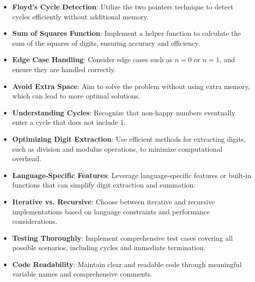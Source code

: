 \begin{itemize}
    \item \textbf{Floyd's Cycle Detection}: Utilize the two pointers technique to detect cycles efficiently without additional memory.
    
    \item \textbf{Sum of Squares Function}: Implement a helper function to calculate the sum of the squares of digits, ensuring accuracy and efficiency.
    
    \item \textbf{Edge Case Handling}: Consider edge cases such as \(n = 0\) or \(n = 1\), and ensure they are handled correctly.
    
    \item \textbf{Avoid Extra Space}: Aim to solve the problem without using extra memory, which can lead to more optimal solutions.
    
    \item \textbf{Understanding Cycles}: Recognize that non-happy numbers eventually enter a cycle that does not include 1.
    
    \item \textbf{Optimizing Digit Extraction}: Use efficient methods for extracting digits, such as division and modulus operations, to minimize computational overhead.
    
    \item \textbf{Language-Specific Features}: Leverage language-specific features or built-in functions that can simplify digit extraction and summation.
    
    \item \textbf{Iterative vs. Recursive}: Choose between iterative and recursive implementations based on language constraints and performance considerations.
    
    \item \textbf{Testing Thoroughly}: Implement comprehensive test cases covering all possible scenarios, including cycles and immediate termination.
    
    \item \textbf{Code Readability}: Maintain clear and readable code through meaningful variable names and comprehensive comments.
\end{itemize}

